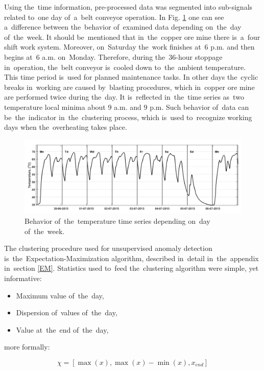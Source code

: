 Using the~time information, pre-processed data was segmented into sub-signals related to~one day of~a~belt conveyor operation. In Fig. \ref{fig: L222_55_days} one can see a~difference between the~behavior of~examined data depending on~the~day of~the~week. It should be~mentioned that in~the~copper ore mine there is~a~four shift work system. Moreover, on~Saturday the~work finishes at~6 p.m. and then begins at~6 a.m. on~Monday. Therefore, during the~$36$-hour stoppage in~operation, the~belt conveyor is~cooled down to~the~ambient temperature. This time period is~used for planned maintenance tasks. In other days the~cyclic breaks in~working are caused by~blasting procedures, which in~copper ore mine are performed twice during the~day. It is~reflected in~the~time series as~two temperature local minima about $9$ a.m. and $9$ p.m. Such behavior of~data can be~the~indicator in~the~clustering process, which is~used to~recognize working days when the~overheating takes place.

\begin{figure}[ht!]
\centering
\includegraphics[width = \textwidth]{wykresy/days.png}
\caption{Behavior of~the~temperature time series depending on~day of~the~week.}
\label{fig: L222_55_days}
\end{figure}

The clustering procedure used for unsupervised anomaly detection is~the~Expectation-Maximization algorithm, described in~detail in~the~appendix in~section \ref{EM}. Statistics used to~feed the~clustering algorithm were simple, yet informative:

\begin{itemize}
\renewcommand{\labelitemi}{$\bullet$}
\item Maximum value of~the~day, 
\item Dispersion of~values of~the~day,
\item Value at~the~end of~the~day,
\end{itemize}
more formally:

\begin{equation}
  \chi=\left[\max(x), \max(x)-\min(x), x_{end} \right]
\end{equation}

